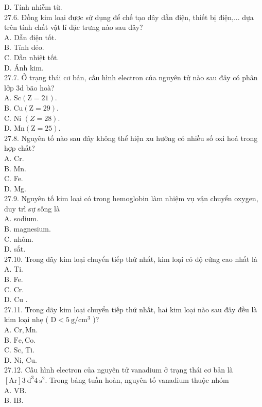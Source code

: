\documentclass[10pt]{article}
\begin{document}
D. Tính nhiễm từ.\\
27.6. Đồng kim loại được sử dụng để chế tạo dây dẫn điện, thiết bị điện,... dựa trên tính chất vật lí đặc trưng nào sau đây?\\
A. Dẫn điện tốt.\\
B. Tính dẻo.\\
C. Dẫn nhiệt tốt.\\
D. Ánh kim.\\
27.7. Ở trạng thái cơ bản, cấu hình electron của nguyên tử nào sau đây có phân lởp 3d bão hoà?\\
A. $\mathrm{Sc}(\mathrm{Z}=21)$.\\
B. $\mathrm{Cu}(\mathrm{Z}=29)$.\\
C. Ni $(Z=28)$.\\
D. $\mathrm{Mn}(\mathrm{Z}=25)$.\\
27.8. Nguyên tố nào sau đây không thể hiện xu hướng có nhiều số oxi hoá trong hợp chất?\\
A. Cr.\\
B. Mn.\\
C. Fe.\\
D. Mg.\\
27.9. Nguyên tố kim loại có trong hemoglobin làm nhiệm vụ vận chuyển oxygen, duy trì sự sống là\\
A. sodium.\\
B. magnesium.\\
C. nhôm.\\
D. sắt.\\
27.10. Trong dãy kim loại chuyển tiếp thứ nhất, kim loại có độ cứng cao nhất là\\
A. Ti.\\
B. Fe.\\
C. Cr.\\
D. Cu .\\
27.11. Trong dãy kim loại chuyển tiếp thứ nhất, hai kim loại nào sau đây đều là kim loại nhẹ ( $\mathrm{D}<5 \mathrm{~g} / \mathrm{cm}^{3}$ )?\\
A. $\mathrm{Cr}, \mathrm{Mn}$.\\
B. $\mathrm{Fe}, \mathrm{Co}$.\\
C. Sc, Ti.\\
D. Ni, Cu.\\
27.12. Cấu hình electron của nguyên tử vanadium ở trạng thái cơ bản là $[\mathrm{Ar}] 3 \mathrm{~d}^{3} 4 \mathrm{~s}^{2}$. Trong bảng tuần hoàn, nguyên tố vanadium thuộc nhóm\\
A. VB.\\
B. IB.\\
\end{document}
